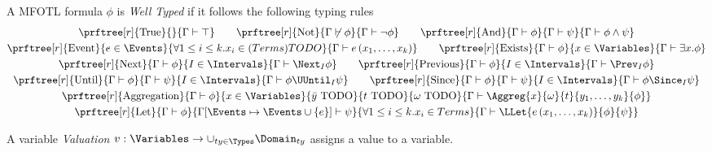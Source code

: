 \begin{definition}
    \label{def:mfotl-typing-rules}
    A MFOTL formula $\phi$ is \emph{Well Typed} if it follows the following typing rules
    \begin{gather*}
        \prftree[r]{\text{True}}
            {}
            {\Gamma \vdash \top} \qquad
        \prftree[r]{\text{Not}}
            {\Gamma \not\vdash \phi}
            {\Gamma \vdash \neg \phi} \qquad
        \prftree[r]{\text{And}}
            {\Gamma \vdash \phi}{\Gamma \vdash \psi}
            {\Gamma \vdash \phi \wedge \psi} \\
        \prftree[r]{\text{Event}}
            {e \in \Events}{\forall 1 \leq i \leq k . x_i \in (Terms) TODO} %
            {\Gamma \vdash e\left(x_1, \dots, x_k\right)} \qquad
        \prftree[r]{\text{Exists}}
            {\Gamma \vdash \phi}{x \in \Variables}
            {\Gamma \vdash \exists x. \phi} \\
        \prftree[r]{\text{Next}}
            {\Gamma \vdash \phi}{I \in \Intervals}
            {\Gamma \vdash \Next_I \phi} \qquad
        \prftree[r]{\text{Previous}}
            {\Gamma \vdash \phi}{I \in \Intervals}
            {\Gamma \vdash \Prev_I \phi} \\
        \prftree[r]{\text{Until}}
            {\Gamma \vdash \phi}{\Gamma \vdash \psi}{I \in \Intervals}
            {\Gamma \vdash \phi \UUntil_I \psi} \qquad
        \prftree[r]{\text{Since}}
            {\Gamma \vdash \phi}{\Gamma \vdash \psi}{I \in \Intervals}
            {\Gamma \vdash \phi \Since_I \psi} \\
        \prftree[r]{\text{Aggregation}} %
            {\Gamma \vdash \phi}{x \in \Variables }{\bar{y} \text{ TODO}}
                {t \text{ TODO}}{\omega \text{ TODO}}
            {\Gamma \vdash \Aggreg{x}{\omega}{t}{y_1,\dots,y_k}{\phi}} \\
        \prftree[r]{\text{Let}}
            {\Gamma \vdash \phi}
            { \Gamma[\Events \mapsto \Events \cup \left\lbrace e \right\rbrace]
                \vdash \psi}
            {\forall 1 \leq i \leq k. x_i \in Terms} %
            {\Gamma \vdash \LLet{e\left(x_1, \dots, x_k \right)}{\phi}{\psi}}
    \end{gather*}
\end{definition}

\begin{definition}
    \label{def:mfotl-valuation}
    A variable \emph{Valuation} $v: \Variables \to \cup_{ty \in \Types} \Domain_{ty}$
    assigns a value to a variable.
\end{definition}

